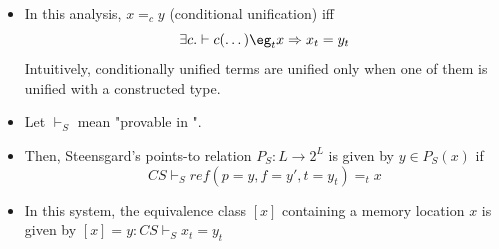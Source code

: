 \documentclass{beamer}
\begin{document}
\begin{frame}[allowframebreaks]
  \framebreak

  \begin{itemize}
  \item In this analysis, $x =_c y$ (conditional unification) iff
    $$ \exists c. \vdash c(\dotso) \eg_t x \Rightarrow x_t = y_t $$
    Intuitively, conditionally unified terms are unified only when one
    of them is unified with a constructed type.
  \item Let $\vdash_S$ mean "provable in ".
  \item Then, Steensgard's points-to relation $P_S: L \rightarrow 2^L$
    is given by $ y \in P_S(x) $ if 
    $$ CS \vdash_S ref(p=y, f=y', t = y_t) =_t x $$
  \item In this system, the equivalence class $[x]$ containing a memory
    location $x$ is given by $[x] = {y: CS \vdash_S x_t = y_t }$
  \end{itemize}

\end{frame}
\end{document}
